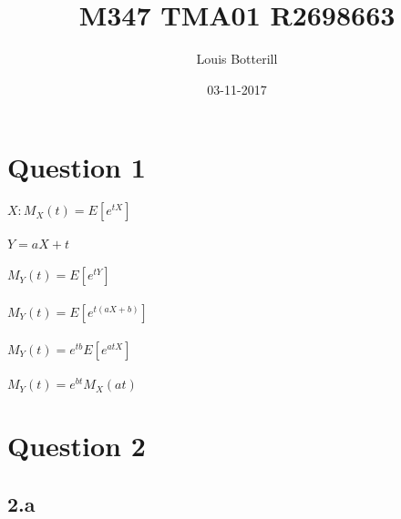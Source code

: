 \documentclass[11pt]{article}   	%
\title{M347 TMA01 R2698663}
\author{Louis Botterill}
\date{03-11-2017}					%
\begin{document}
\maketitle

\pagebreak

\section*{Question 1}

$ X : M_X(t) = E\left[ e^{tX} \right] $ \\
\\
$ Y = aX + t $ \\
\\
$ M_Y(t) = E\left[ e^{tY} \right] $ \\
\\
$ M_Y(t) = E\left[ e^{t(aX + b)} \right] $ \\
\\
$ M_Y(t) = e^{tb} E\left[ e^{atX} \right] $ \\
\\
$ M_Y(t) = e^{bt} M_X(at) $ \\


\section*{Question 2}

\subsection*{2.a}
\end{document}

